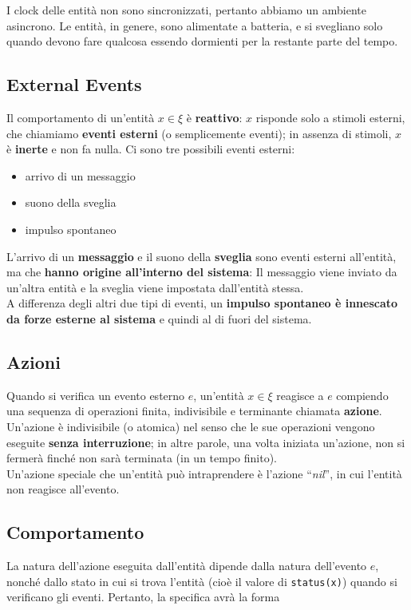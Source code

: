 I clock delle entità non sono sincronizzati, pertanto abbiamo un ambiente
asincrono. Le entità, in genere, sono alimentate a batteria, e si svegliano solo
quando devono fare qualcosa essendo dormienti per la restante parte del tempo.

\subsection{External Events}
Il comportamento di un'entità $x \in \xi$ è \textbf{reattivo}: $x$ risponde solo
a stimoli esterni, che chiamiamo \textbf{eventi esterni} (o semplicemente
eventi); in assenza di stimoli, $x$ è \textbf{inerte} e non fa nulla. Ci sono
tre possibili eventi esterni:

\begin{itemize}
    \item arrivo di un messaggio
    \item suono della sveglia
    \item impulso spontaneo
\end{itemize}

L'arrivo di un \textbf{messaggio} e il suono della \textbf{sveglia} sono eventi
esterni all'entità, ma che \textbf{hanno origine all'interno del sistema}: Il
messaggio viene inviato da un'altra entità e la sveglia viene impostata
dall'entità stessa.\\
A differenza degli altri due tipi di eventi, un \textbf{impulso spontaneo è
    innescato da forze esterne al sistema} e quindi al di fuori del sistema.

\subsection{Azioni}
Quando si verifica un evento esterno $e$, un'entità $x \in \xi$ reagisce a $e$
compiendo una sequenza di operazioni finita, indivisibile e terminante chiamata
\textbf{azione}. Un'azione è indivisibile (o atomica) nel senso che le sue
operazioni vengono eseguite \textbf{senza interruzione}; in altre parole, una
volta iniziata un'azione, non si fermerà finché non sarà terminata (in un tempo
finito).\\
Un'azione speciale che un'entità può intraprendere è l'azione ``\textit{nil}'', in
cui l'entità non reagisce all'evento.

\subsection{Comportamento}
La natura dell'azione eseguita dall'entità dipende dalla natura dell'evento $e$,
nonché dallo stato in cui si trova l'entità (cioè il valore di \verb|status(x)|)
quando si verificano gli eventi. Pertanto, la specifica avrà la forma

